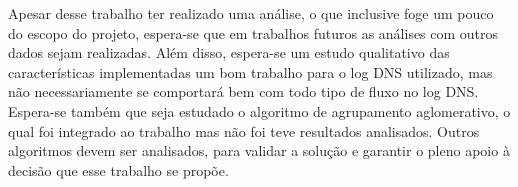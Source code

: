 Apesar desse trabalho ter realizado uma análise, o que inclusive foge um pouco do escopo do projeto, espera-se que em trabalhos futuros as análises com outros dados sejam realizadas. Além disso, espera-se um estudo qualitativo das características implementadas um bom trabalho para o log DNS utilizado, mas não necessariamente se comportará bem com todo tipo de fluxo no log DNS. Espera-se também que seja estudado o algoritmo de agrupamento aglomerativo, o qual foi integrado ao trabalho mas não foi teve resultados analisados. Outros algoritmos devem ser analisados, para validar a solução e garantir o pleno apoio à decisão que esse trabalho se propõe.